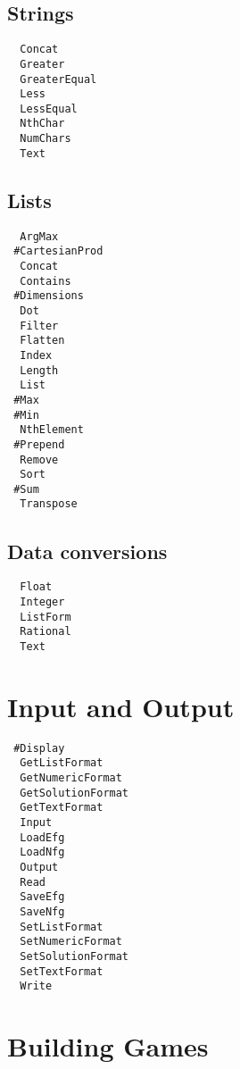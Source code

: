 \subsection{Strings}

\begin{multicols}{3}
\begin{verbatim}
  Concat
  Greater
  GreaterEqual
  Less
  LessEqual
  NthChar 
  NumChars 
  Text
\end{verbatim}
\end{multicols}

\subsection{Lists}

\begin{multicols}{3}
\begin{verbatim}
  ArgMax 
 #CartesianProd
  Concat 
  Contains 
 #Dimensions
  Dot 
  Filter 
  Flatten 
  Index
  Length 
  List 
 #Max
 #Min
  NthElement 
 #Prepend
  Remove 
  Sort 
 #Sum 
  Transpose 
\end{verbatim}
\end{multicols}

\subsection{Data conversions}

\begin{multicols}{3}
\begin{verbatim}
  Float 
  Integer 
  ListForm 
  Rational 
  Text 
\end{verbatim}
\end{multicols}

\section{Input and Output}

\begin{multicols}{3}
\begin{verbatim}
 #Display 
  GetListFormat 
  GetNumericFormat 
  GetSolutionFormat 
  GetTextFormat 
  Input 
  LoadEfg 
  LoadNfg 
  Output 
  Read 
  SaveEfg 
  SaveNfg 
  SetListFormat 
  SetNumericFormat 
  SetSolutionFormat 
  SetTextFormat 
  Write   
\end{verbatim}
\end{multicols}

\section{Building Games}

